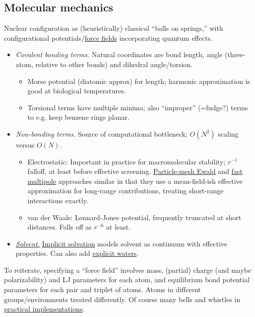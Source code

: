 \documentclass[notitlepage,openany,11pt]{report}
\theoremstyle{plain}%
\numberwithin{equation}{section}
\begin{document}
\subsection{Molecular mechanics}
Nuclear configuration as (heuristically) classical ``balls on springs,'' with configurational potentials/\href{https://en.wikipedia.org/wiki/Force_field_(chemistry)}{force fields} incorporating quantum effects.
\begin{itemize}

\item \emph{Covalent bonding terms.} Natural coordinates are bond length, angle (three-atom, relative to other bonds) and dihedral angle/torsion. 
\begin{itemize}
\item Morse potential (diatomic approx) for length; harmonic approximation is good at biological temperatures. 
\item Torsional terms have multiple minima; also ``improper'' (=fudge?) terms to e.g. keep benzene rings planar.
\end{itemize}

\item \emph{Non-bonding terms.} Source of computational bottleneck; $O(N^{2})$ scaling versus $O(N)$.
\begin{itemize}
\item Electrostatic: Important in practice for macromolecular stability; $r^{-1}$ falloff, at least before effective screening. \href{https://en.wikipedia.org/wiki/Ewald_summation#Particle_mesh_Ewald_(PME)_method}{Particle-mesh Ewald} and \href{https://en.wikipedia.org/wiki/Fast_multipole_method}{fast multipole} approaches similar in that they use a mean-field-ish effective approximation for long-range contributions, treating short-range interactions exactly.
\item van der Waals: Lennard-Jones potential, frequently truncated at short distances. Falls off as $r^{-6}$ at least.
\end{itemize}

\item \emph{\href{https://en.wikipedia.org/wiki/Solvent_model}{Solvent.}} \href{https://en.wikipedia.org/wiki/Implicit_solvation}{Implicit solvation} models solvent as continuum with effective properties. Can also add \href{https://en.wikipedia.org/wiki/Water_model}{explicit waters}.

\end{itemize}

To reiterate, specifying a ``force field'' involves mass, (partial) charge (and maybe polarizability) and LJ parameters for each atom, and equilibrium bond potential parameters for each pair and triplet of atoms. Atoms in different groups/environments treated differently. Of course many bells and whistles in \href{https://en.wikipedia.org/wiki/Comparison_of_force-field_implementations}{practical implementations}.
\end{document}
